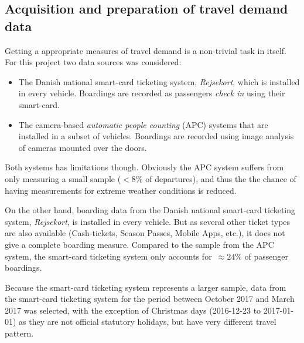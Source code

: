 
\subsection{Acquisition and preparation of travel demand data}
\label{appx:travel_demand_data_prep}

Getting a appropriate measures of travel demand is a non-trivial task in itself. For this project two data sources was considered:
\begin{itemize}
    \item The Danish national smart-card ticketing system, \emph{Rejsekort}, which is installed in every vehicle. Boardings are recorded as passengers \emph{check in} using their smart-card.
    \item The camera-based \emph{automatic people counting} (APC) systems that are installed in a subset of vehicles. Boardings are recorded using image analysis of cameras mounted over the doors.
\end{itemize}

Both systems has limitations though. Obviously the APC system suffers from only measuring a small sample ($<8\%$ of departures), and thus the the chance of having measurements for extreme weather conditions is reduced.

On the other hand, boarding data from the Danish national smart-card ticketing system, \emph{Rejsekort}, is installed in every vehicle. But as several other ticket types are also available (Cash-tickets, Season Passes, Mobile Apps, etc.), it does not give a complete boarding measure. Compared to the sample from the APC system, the smart-card ticketing system only accounts for~$\approx 24\%$ of passenger boardings.

Because the smart-card ticketing system represents a larger sample, data from the smart-card ticketing system for the period between October 2017 and March 2017 was selected, with the exception of Christmas days (2016-12-23 to 2017-01-01) as they are not official statutory holidays, but have very different travel pattern.